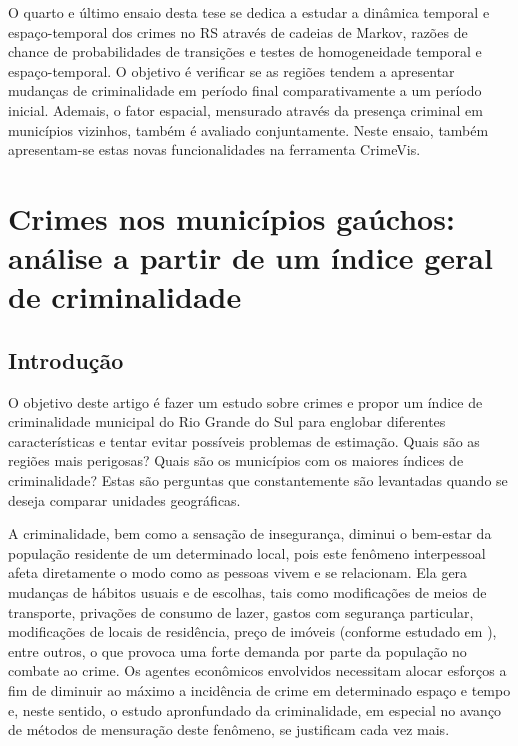 \documentclass[12pt,openright,oneside,a4paper,english,french,spanish]{abntex2}
\numberwithin{table}{section} %
\numberwithin{figure}{section} %
\newcommand{\co}{\citeonline}
\begin{document}
O quarto e último ensaio desta tese se dedica a estudar a dinâmica temporal e espaço-temporal dos crimes no RS através de cadeias de Markov, razões de chance de probabilidades de transições e testes de homogeneidade temporal e espaço-temporal. O objetivo é verificar se as regiões tendem a apresentar mudanças de criminalidade em período final comparativamente a um período inicial. Ademais, o fator espacial, mensurado através da presença criminal em municípios vizinhos, também é avaliado conjuntamente. Neste ensaio, também apresentam-se estas novas funcionalidades na ferramenta CrimeVis.










\chapter{Crimes nos municípios gaúchos: análise a partir de um índice geral de criminalidade\label{chap:indice}}

\section{Introdução\label{sec:Introdução_Indice}}

O objetivo deste artigo é fazer um estudo sobre crimes e propor um índice de criminalidade municipal do Rio Grande do Sul para englobar diferentes características e tentar evitar possíveis problemas de estimação. Quais são as regiões mais perigosas? Quais são os municípios com os maiores índices de criminalidade? Estas são perguntas que constantemente são levantadas quando se deseja comparar unidades geográficas. 

A criminalidade, bem como a sensação de insegurança, diminui o bem-estar da população residente de um determinado local, pois este fenômeno interpessoal afeta diretamente o modo como as pessoas vivem e se relacionam. Ela gera mudanças de hábitos usuais e de escolhas, tais como modificações de meios de transporte, privações de consumo de lazer, gastos com segurança particular, modificações de locais de residência, preço de imóveis (conforme estudado em \co{frischtak2012fedny}), entre outros, o que provoca uma forte demanda por parte da população no combate ao crime. Os agentes econômicos envolvidos necessitam alocar esforços a fim de diminuir ao máximo a incidência de crime em determinado espaço e tempo e, neste sentido, o estudo apronfundado da criminalidade, em especial no avanço de métodos de mensuração deste fenômeno, se justificam cada vez mais.
\end{document}
